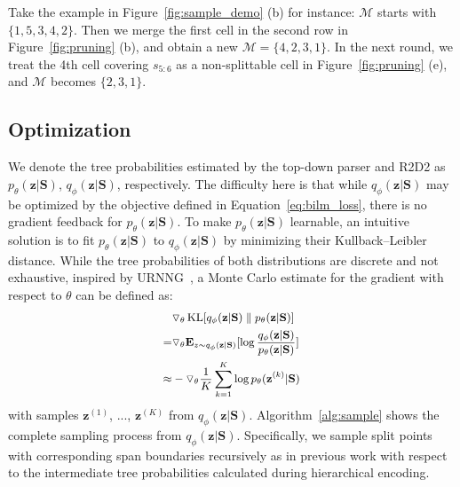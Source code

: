 Take the example in Figure~\ref{fig:sample_demo} (b) for instance: 
$\mathcal{M}$ starts with $\{1, 5, 3, 4, 2\}$.
Then we merge the first cell in the second row in Figure~\ref{fig:pruning} (b),
and obtain a new $\mathcal{M} = \{4, 2, 3, 1\}$. 
In the next round, we treat the 4th cell covering $s_{5:6}$ as a non-splittable cell in Figure~\ref{fig:pruning} (e), 
and $\mathcal{M}$ becomes $\{2, 3, 1\}$.

\subsection{Optimization}\label{sec:opt}

We denote the tree probabilities estimated by the top-down parser and R2D2 as $p_{\theta}(\textbf{z}|\textbf{S})$, $q_{\phi}(\textbf{z}|\textbf{S})$, respectively. 
The difficulty here is that while
$q_{\phi}(\textbf{z}|\textbf{S})$ may be optimized by the objective defined in Equation~\ref{eq:bilm_loss}, 
there is no gradient feedback for $p_{\theta}(\textbf{z}|\textbf{S})$. 
To make $p_{\theta}(\textbf{z}|\textbf{S})$ learnable, an intuitive solution is to fit $p_{\theta}(\textbf{z}|\textbf{S})$ to $q_{\phi}(\textbf{z}|\textbf{S})$ by minimizing their Kullback–Leibler distance. 
While the tree probabilities of both distributions are discrete and not exhaustive,
inspired by URNNG~\cite{dblp:conf/naacl/kimrykdm19}, a Monte Carlo estimate for the gradient with respect to $\theta$ can be defined as:
\begin{equation}
\small
\begin{aligned}
&\triangledown_{\theta} \KL[q_{\phi}(\textbf{z}|\textbf{S}) \parallel p_{\theta}(\textbf{z}|\textbf{S}) ] \\
= &\triangledown_{\theta} \mathbf{E}_{z \sim q_{\phi}(\textbf{z}|\textbf{S})}[\log \frac{q_{\phi}(\textbf{z}|\textbf{S})}{p_{\theta}(\textbf{z}|\textbf{S})}] \\
\approx &-\triangledown_{\theta} \frac{1}{K}\sum_{k=1}^{K}\log p_{\theta}(\textbf{z}^{(k)}|\textbf{S})
\end{aligned}
\vspace{-1.5pt}
\end{equation}
with samples $\textbf{z}^{(1)}$, ..., $\textbf{z}^{(K)}$ from $q_{\phi}(\textbf{z}|\textbf{S})$. 
Algorithm~\ref{alg:sample} shows the complete sampling process from $q_{\phi}(\textbf{z}|\textbf{S})$.
Specifically, we sample split points with corresponding span boundaries recursively as in previous work \cite{DBLP:journals/corr/cmp-lg-9805007,DBLP:conf/emnlp/FinkelMN06,dblp:conf/naacl/kimrykdm19} 
with respect to the intermediate tree probabilities calculated during hierarchical encoding.

